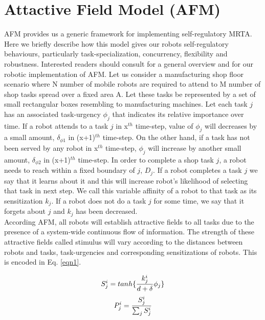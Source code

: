 \documentclass[letterpaper, 10 pt, times, conference]{ieeeconf} %
\begin{document}
\section{Attactive Field Model (AFM)}
\label{sec:afm}
AFM provides us a generic framework for implementing self-regulatory MRTA. Here we briefly describe how this model gives our robots self-regulatory behaviours, particularly task-specialization, concurrency, flexibility and robustness. Interested readers should consult \cite{Elsa} for a general overview and \cite{Sarker} for our robotic implementation of AFM.
Let us consider a manufacturing shop floor scenario where N number of mobile robots are required to attend to M number of shop tasks spread over a fixed area A. Let these tasks be represented by a set of small rectangular boxes resembling to manufacturing machines. Let each task $j$ has an associated task-urgency $\phi_j$ that indicates its relative importance over time. If a robot attends to a task $j$ in x$^{th}$ time-step, value of $\phi_j$ will decreases by a small amount, $\delta_{\phi 1}$ in (x+1)$^{th}$ time-step. On the other hand, if a task has not been served by any robot in x$^{th}$ time-step, $\phi_j$ will increase by another small amount, $\delta_{\phi 2}$ in (x+1)$^{th}$ time-step. In order to complete a shop task $j$, a robot needs to reach within a fixed boundary of $j$, $D_j$. If a robot completes a task $j$ we say that it learns about it and this will increase robot's likelihood of selecting that task in next step. We call this variable affinity of a robot to that task as its sensitization $k_j$. If a robot does not do a task $j$ for some time, we say that it forgets about $j$ and $k_j$ has been decreased.\\
According AFM, all robots will establish attractive fields to all tasks due to the presence of a system-wide continuous flow of information. The strength of these attractive fields called stimulus will vary according to the distances between robots and tasks, task-urgencies and corresponding sensitizations of robots. This is encoded in Eq. \ref{eqn1}.
\begin{multicols}{2} 
\begin{equation}
\small
S_{j}^{i} = tanh\{\frac{k_{j}^{i}}{d+\delta } \phi _{j}\}
\label{eqn1}
\end{equation}
\vspace*{0.25cm}
\begin{equation}
\small
P_{j}^{i} = \frac{S_{j}^{i}}{\sum_{j}^{}S_{j}^{i}}
\label{eqn2}
\end{equation}
\end{multicols}
\end{document}
